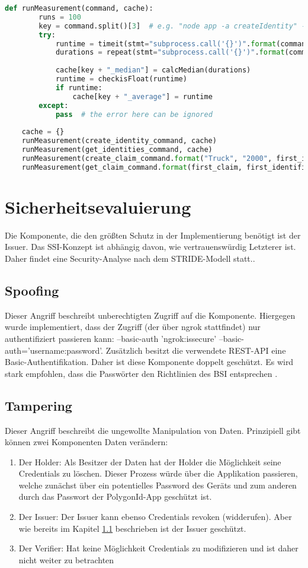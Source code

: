 \begin{lstlisting}[language=python]
	def runMeasurement(command, cache):
		runs = 100
		key = command.split()[3]  # e.g. "node app -a createIdentity" -> createIdentity
		try:
			runtime = timeit(stmt="subprocess.call('{}')".format(command), setup="import subprocess", number=runs, )
			durations = repeat(stmt="subprocess.call('{}')".format(command), setup="import subprocess", number=1, repeat=runs)
		
			cache[key + "_median"] = calcMedian(durations)
			runtime = checkisFloat(runtime)
			if runtime:
				cache[key + "_average"] = runtime
		except:
			pass  # the error here can be ignored
			
	cache = {}
	runMeasurement(create_identity_command, cache)
	runMeasurement(get_identities_command, cache)
	runMeasurement(create_claim_command.format("Truck", "2000", first_identifier), cache)
	runMeasurement(get_claim_command.format(first_claim, first_identifier), cache)	
\end{lstlisting}	

\section{Sicherheitsevaluierung}
Die Komponente, die den größten Schutz in der Implementierung benötigt ist der Issuer. Das SSI-Konzept ist abhängig davon, wie vertrauenswürdig Letzterer ist. Daher findet eine Security-Analyse nach dem STRIDE-Modell \cite{ID59} statt..

\subsection{Spoofing}
\label{Spoofing}
Dieser Angriff beschreibt unberechtigten Zugriff auf die Komponente. Hiergegen wurde implementiert, dass der Zugriff (der über ngrok stattfindet) nur authentifiziert passieren kann: --basic-auth 'ngrok:issecure' --basic-auth='username:password'. Zusätzlich besitzt die verwendete REST-API eine Basic-Authentifikation. Daher ist diese Komponente doppelt geschützt. Es wird stark empfohlen, dass die Passwörter den Richtlinien des BSI entsprechen \cite{ID60}.

\subsection{Tampering}
Dieser Angriff beschreibt die ungewollte Manipulation von Daten. Prinzipiell gibt können zwei Komponenten Daten verändern:
\begin{enumerate}
	\item Der Holder: Als Besitzer der Daten hat der Holder die Möglichkeit seine Credentials zu löschen. Dieser Prozess würde über die Applikation passieren, welche zunächst über ein potentielles Password des Geräts und zum anderen durch das Passwort der PolygonId-App geschützt ist.
	\item Der Issuer: Der Issuer kann ebenso Credentials revoken (widderufen). Aber wie bereits im Kapitel \ref{Spoofing} beschrieben ist der Issuer geschützt.
	\item Der Verifier: Hat keine Möglichkeit Credentials zu modifizieren und ist daher nicht weiter zu betrachten
\end{enumerate}

